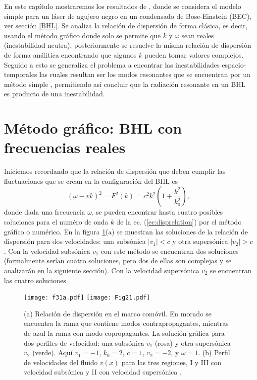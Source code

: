 En este cap\'{i}tulo mostraremos los resultados de \cite{2018Bermudez}, donde se considera el modelo simple para un láser de agujero negro en un condensado de Bose-Einstein (BEC), ver secci\'{o}n \ref{BHL}. Se analiza la relaci\'{o}n de dispersi\'{o}n de forma cl\'{a}sica, es decir, usando el m\'{e}todo gr\'{a}fico donde solo se permite que $k$ y $\omega$ sean reales (inestabilidad neutra), posteriormente se resuelve la misma relaci\'{o}n de dispersi\'{o}n de forma an\'{a}litica encontrando que algunos $k$ pueden tomar valores complejos. Seguido a esto se generaliza el problema a encontrar las inestabilidades espacio-temporales las cuales resultan ser los modos resonantes que se encuentran por un m\'{e}todo simple \citep{Leonhardt2007}, permitiendo as\'{i} concluir que la radiaci\'{o}n resonante en un BHL es producto de una inestabilidad.

\section{M\'{e}todo gr\'{a}fico: BHL con frecuencias reales}\label{sec:real}
Iniciemos recordando que la relaci\'{o}n de dispersi\'{o}n que deben cumplir las fluctuaciones que se crean en la configuraci\'{o}n del BHL es
\begin{equation}\label{ec:disprelation}
(\omega-vk)^2=F^2(k)=c^2k^2\left(1+\frac{k^2}{k_0^2}\right),
\end{equation}
donde dada una frecuencia $\omega$, se pueden encontrar hasta cuatro posibles soluciones para el num\'{e}ro de onda $k$ de la ec. (\ref{ec:disprelation}) por el  m\'{e}todo gr\'{a}fico o num\'erico. En la figura \ref{fig:3.1}(a) se muestran las soluciones de la relaci\'{o}n de dispersi\'{o}n para dos velocidades: una subs\'{o}nica $|v_1|<c$ y otra supers\'{o}nica $|v_2|>c$. Con la velocidad subs\'{o}nica $v_1$ con este m\'{e}todo se encuentran dos soluciones (formalmente ser\'{i}an cuatro soluciones, pero dos de ellas son complejas y se analizar\'{a}n en la siguiente secci\'{o}n). Con la velocidad supers\'{o}nica $v_2$ se encuentran las cuatro soluciones.\\
\begin{figure}
   \centering
   \texttt{[image: f31a.pdf]}%
   \hspace{0.1cm}%
   \texttt{[image: Fig21.pdf]}%
   \caption{(a) Relaci\'{o}n de dispersi\'{o}n en el marco com\'{o}vil. En morado se encuentra la rama que contiene modos contrapropagantes, mientras de azul la rama con modo copropagantes. La solución gráfica para dos perfiles de velocidad: una subsónica $v_1$ (rosa) y otra supersónica $v_2$ (verde). Aquí $v_1= -1$, $k_0 = 2$, $c = 1$, $v_2= - 2$, y $\omega=1$. (b) Perfil de velocidades del fluido $v(x)$ para las tres regiones, I y III con velocidad subs\'{o}nica y II con velocidad supers\'{o}nica \citep{2018Bermudez}.} 
   \label{fig:3.1}
\end{figure}

